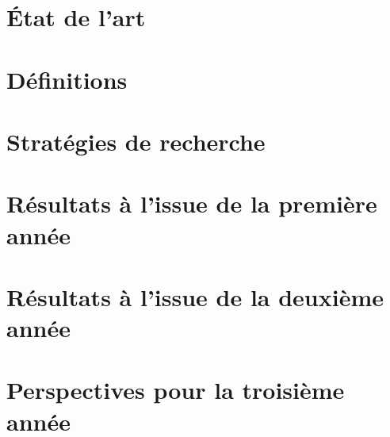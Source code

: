 \documentclass[a4paper,11pt]{article}
\begin{document}
\section{État de l'art}


\section{Définitions}


\section{Stratégies de recherche}


\section{Résultats à l'issue de la première année}


\section{Résultats à l'issue de la deuxième année}


\section{Perspectives pour la troisième année}


\printbibliography
\end{document}
